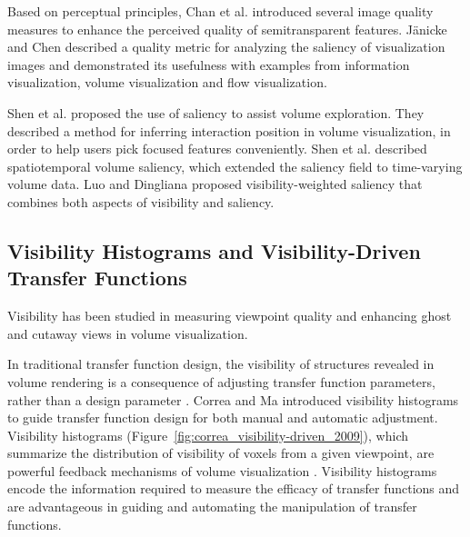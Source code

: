 \documentclass{egpubl}
\begin{document}
Based on perceptual principles, Chan et al. \cite{chan_perception-based_2009} introduced several image quality measures to enhance the perceived quality of semitransparent features.
J{\"a}nicke and Chen \cite{janicke_salience-based_2010} described a quality metric for analyzing the saliency of visualization images and demonstrated its usefulness with examples from information visualization, volume visualization and flow visualization.

Shen et al. \cite{shen_save:_2014} proposed the use of saliency to assist volume exploration. They described a method for inferring interaction position in volume visualization, in order to help users pick focused features conveniently.
Shen et al. \cite{shen_spatiotemporal_2015} described spatiotemporal volume saliency, which extended the saliency field \cite{kim_saliency-guided_2006} to time-varying volume data. Luo and Dingliana \cite{luo_visibility-weighted_2015} proposed visibility-weighted saliency that combines both aspects of visibility and saliency.

\subsection{Visibility Histograms and Visibility-Driven Transfer Functions}
Visibility has been studied in measuring viewpoint quality \cite{bordoloi_view_2005} and enhancing ghost and cutaway views \cite{viola_importance-driven_2004} in volume visualization.

In traditional transfer function design, the visibility of structures revealed in volume rendering is a consequence of adjusting transfer function parameters, rather than a design parameter \cite{preim_visual_2013}.
Correa and Ma \cite{correa_visibility-driven_2009} introduced visibility histograms to guide transfer function design for both manual and automatic adjustment.
Visibility histograms (Figure~\ref{fig:correa_visibility-driven_2009}), which summarize the distribution of visibility of voxels from a given viewpoint, are powerful feedback mechanisms of volume visualization \cite{emsenhuber_visibility_2008}.
Visibility histograms encode the information required to measure the efficacy of transfer functions and are advantageous in guiding and automating the manipulation of transfer functions.
\end{document}
